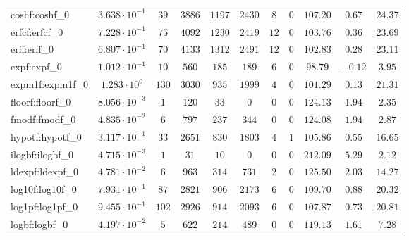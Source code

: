 \begin{tabular}{|l|c|c|c|c|c|c|c|c|c|c|}
coshf:coshf\_0               & $ 3.638 \cdot 10^{-1} $ & $ 39     $ & $ 3886  $ & $ 1197  $ & $ 2430  $ & $ 8   $ & $ 0 $ & $ 107.20      $ & $ 0.67    $ & $ 24.37   $ \\
erfcf:erfcf\_0               & $ 7.228 \cdot 10^{-1} $ & $ 75     $ & $ 4092  $ & $ 1230  $ & $ 2419  $ & $ 12  $ & $ 0 $ & $ 103.76      $ & $ 0.36    $ & $ 23.69   $ \\
erff:erff\_0                 & $ 6.807 \cdot 10^{-1} $ & $ 70     $ & $ 4133  $ & $ 1312  $ & $ 2491  $ & $ 12  $ & $ 0 $ & $ 102.83      $ & $ 0.28    $ & $ 23.11   $ \\
expf:expf\_0                 & $ 1.012 \cdot 10^{-1} $ & $ 10     $ & $ 560   $ & $ 185   $ & $ 189   $ & $ 6   $ & $ 0 $ & $ 98.79       $ & $ -0.12   $ & $ 3.95    $ \\
expm1f:expm1f\_0             & $ 1.283 \cdot 10^{0}  $ & $ 130    $ & $ 3030  $ & $ 935   $ & $ 1999  $ & $ 4   $ & $ 0 $ & $ 101.29      $ & $ 0.13    $ & $ 21.31   $ \\
floorf:floorf\_0             & $ 8.056 \cdot 10^{-3} $ & $ 1      $ & $ 120   $ & $ 33    $ & $ 0     $ & $ 0   $ & $ 0 $ & $ 124.13      $ & $ 1.94    $ & $ 2.35    $ \\
fmodf:fmodf\_0               & $ 4.835 \cdot 10^{-2} $ & $ 6      $ & $ 797   $ & $ 237   $ & $ 344   $ & $ 0   $ & $ 0 $ & $ 124.08      $ & $ 1.94    $ & $ 2.87    $ \\
hypotf:hypotf\_0             & $ 3.117 \cdot 10^{-1} $ & $ 33     $ & $ 2651  $ & $ 830   $ & $ 1803  $ & $ 4   $ & $ 1 $ & $ 105.86      $ & $ 0.55    $ & $ 16.65   $ \\
ilogbf:ilogbf\_0             & $ 4.715 \cdot 10^{-3} $ & $ 1      $ & $ 31    $ & $ 10    $ & $ 0     $ & $ 0   $ & $ 0 $ & $ 212.09      $ & $ 5.29    $ & $ 2.12    $ \\
ldexpf:ldexpf\_0             & $ 4.781 \cdot 10^{-2} $ & $ 6      $ & $ 963   $ & $ 314   $ & $ 731   $ & $ 2   $ & $ 0 $ & $ 125.50      $ & $ 2.03    $ & $ 14.27   $ \\
log10f:log10f\_0             & $ 7.931 \cdot 10^{-1} $ & $ 87     $ & $ 2821  $ & $ 906   $ & $ 2173  $ & $ 6   $ & $ 0 $ & $ 109.70      $ & $ 0.88    $ & $ 20.32   $ \\
log1pf:log1pf\_0             & $ 9.455 \cdot 10^{-1} $ & $ 102    $ & $ 2926  $ & $ 914   $ & $ 2093  $ & $ 6   $ & $ 0 $ & $ 107.87      $ & $ 0.73    $ & $ 20.81   $ \\
logbf:logbf\_0               & $ 4.197 \cdot 10^{-2} $ & $ 5      $ & $ 622   $ & $ 214   $ & $ 489   $ & $ 0   $ & $ 0 $ & $ 119.13      $ & $ 1.61    $ & $ 7.28    $ \\

\end{tabular}
